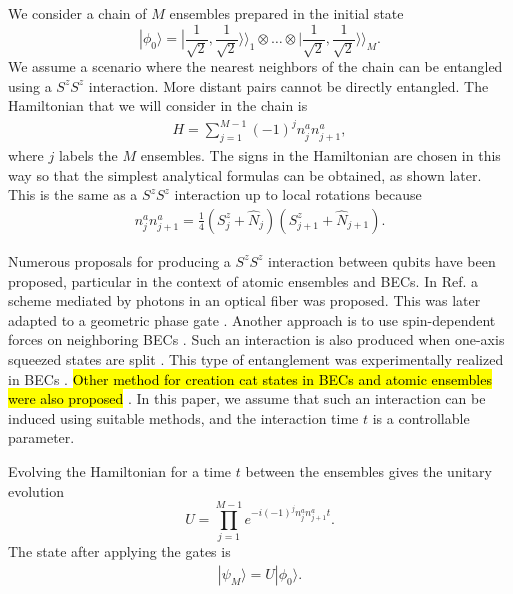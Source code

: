 \documentclass{WileyMSP-template}
\begin{document}
We consider a chain of $ M $ ensembles prepared in the initial state
%
%
\begin{equation}
|\phi_0 \rangle=|\frac{1}{\sqrt{2}},\frac{1}{\sqrt{2}}\rangle\rangle_{1}\otimes\dots\otimes|\frac{1}{\sqrt{2}},\frac{1}{\sqrt{2}}\rangle\rangle_{M} .  \label{initstate}
\end{equation}
%
We assume a scenario where the nearest neighbors of the chain can be entangled using a $ S^z S^z $  interaction. More distant pairs cannot be directly entangled.  The Hamiltonian that we will consider in the chain is
%
\begin{align}
H=  \sum_{j=1}^{M-1} (-1)^j n_j^a n_{j+1}^a ,
\label{mainham}
\end{align}
%
where $ j$ labels the  $M $ ensembles. The signs in the Hamiltonian are chosen in this way so that the simplest analytical formulas can be obtained, as shown later.
 This is the same as a $ S^z S^z $ interaction up to local rotations because
%
\begin{align}
n^a_j n_{j+1}^a = \frac{1}{4} (S^z_j + \hat{N}_j) (S^z_{j+1} + \hat{N}_{j+1} ).
\end{align}

Numerous proposals for producing a $ S^z S^z $ interaction between qubits have been proposed, particular in the context of atomic ensembles and BECs.  In Ref. \cite{pyrkov2013entanglement} a scheme mediated by photons in an optical fiber was proposed.  This was later adapted to a geometric phase gate \cite{hussain2014geometric}. Another approach is to use spin-dependent forces on neighboring BECs \cite{treutlein2006}.
Such an interaction is also produced when one-axis squeezed states are split \cite{Jing_2019}.  This type of entanglement was  experimentally realized in BECs \cite{fadel2018spatial,Colciaghi2023}. \hl{Other method for creation cat states in BECs and atomic ensembles were also proposed }\cite{simon14,nori21}.  In this paper, we assume that such an interaction can be induced using suitable methods, and the interaction time $ t $ is a controllable parameter.

Evolving the Hamiltonian for a time $ t $ between the ensembles gives the unitary evolution
%
\begin{equation}
U=\prod^{M-1}_{j=1} e^{- i (-1)^j  n^a_j n^a_{j+1} t} .
\end{equation}
%
The state after applying the gates is
%
\begin{align}
|\psi_M \rangle = U | \phi_0 \rangle .
\end{align}
\end{document}
